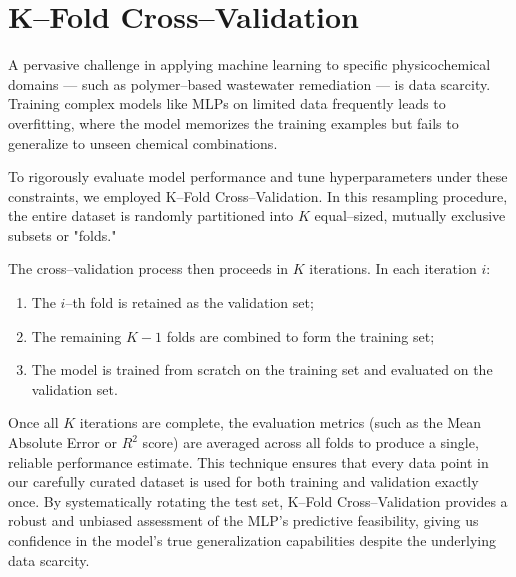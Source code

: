 \section{K--Fold Cross--Validation}
\label{sec:kfold}

A pervasive challenge in applying machine learning to specific physicochemical domains — such as polymer--based wastewater remediation — is data scarcity. Training complex models like MLPs on limited data frequently leads to overfitting, where the model memorizes the training examples but fails to generalize to unseen chemical combinations.

To rigorously evaluate model performance and tune hyperparameters under these constraints, we employed K--Fold Cross--Validation.  In this resampling procedure, the entire dataset is randomly partitioned into $K$ equal--sized, mutually exclusive subsets or "folds."

The cross--validation process then proceeds in $K$ iterations. In each iteration $i$:
\begin{enumerate}
	\item The $i$--th fold is retained as the validation set;
	\item The remaining $K-1$ folds are combined to form the training set;
	\item The model is trained from scratch on the training set and evaluated on the validation set.
\end{enumerate}

Once all $K$ iterations are complete, the evaluation metrics (such as the Mean Absolute Error or $R^2$ score) are averaged across all folds to produce a single, reliable performance estimate. This technique ensures that every data point in our carefully curated dataset is used for both training and validation exactly once. By systematically rotating the test set, K--Fold Cross--Validation provides a robust and unbiased assessment of the MLP's predictive feasibility, giving us confidence in the model's true generalization capabilities despite the underlying data scarcity.
